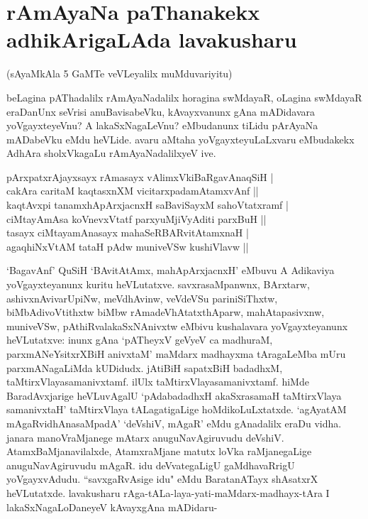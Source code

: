\section*{rAmAyaNa paThanakekx adhikArigaLAda lavakusharu} 

\begin{center} 
(sAyaMkAla 5 GaMTe veVLeyalilx muMduvariyitu) 
\end{center} 


beLagina pAThadalilx rAmAyaNadalilx horagina swMdayaR, oLagina swMdayaR eraDanUnx seVrisi anuBavisabeVku, kAvayxvanunx gAna mADidavara yoVgayxteyeVnu? A lakaSxNagaLeVnu? eMbudanunx tiLidu pArAyaNa mADabeVku eMdu heVLide. avaru aMtaha yoVgayxteyuLaLxvaru eMbudakekx AdhAra sholxVkagaLu rAmAyaNadalilxyeV ive. 

\begin{shloka}
pArxpatxrAjayxsayx rAmasayx vAlimxVkiBaRgavAnaqSiH |\label{188a}\\ 
cakAra caritaM kaqtasxnXM vicitarxpadamAtamxvAnf ||\\
kaqtAvxpi tanamxhApArxjacnxH saBaviSayxM sahoVtatxramf |\\ 
ciMtayAmAsa koVnevxVtatf parxyuMjiVyAditi parxBuH ||\\ 
tasayx ciMtayamAnasayx mahaSeRBARvitAtamxnaH |\\ 
agaqhiNxVtAM tataH pAdw muniveVSw kushiVlavw ||
\end{shloka}

`BagavAnf' QuSiH `BAvitAtAmx, mahApArxjacnxH' eMbuvu A Adikaviya yoVgayxteyanunx kuritu heVLutatxve. savxrasaMpanwnx, BArxtarw, ashivxnAvivarUpiNw, meVdhAvinw, veVdeVSu pariniSiThxtw, biMbAdivoVtithxtw biMbw rAmadeVhAtatxthAparw, mahAtapasivxnw, muniveVSw, pAthiRvalakaSxNAnivxtw eMbivu kushalavara yoVgayxteyanunx heVLutatxve: inunx gAna `pATheyxV geVyeV ca madhuraM, parxmANeYsitxrXBiH anivxtaM' maMdarx madhayxma tAragaLeMba mUru parxmANagaLiMda kUDidudx. jAtiBiH sapatxBiH badadhxM, taMtirxVlayasamanivxtamf. ilUlx taMtirxVlayasamanivxtamf. hiMde BaradAvxjarige heVLuvAgalU `pAdabadadhxH akaSxrasamaH taMtirxVlaya samanivxtaH' taMtirxVlaya tALagatigaLige hoMdikoLuLxtatxde. `agAyatAM mAgaRvidhAnasaMpadA'\label{188} `deVshiV, mAgaR' eMdu gAnadalilx eraDu vidha. janara manoVraMjanege mAtarx anuguNavAgiruvudu deVshiV. AtamxBaMjanavilalxde, AtamxraMjane matutx loVka raMjanegaLige anuguNavAgiruvudu mAgaR. idu deVvategaLigU gaMdhavaRrigU yoVgayxvAdudu. ``savxgaRvAsige idu" eMdu BaratanATayx shAsatxrX heVLutatxde. lavakusharu rAga-tALa-laya-yati-maMdarx-madhayx-tAra I lakaSxNagaLoDaneyeV kAvayxgAna mADidaru- 


